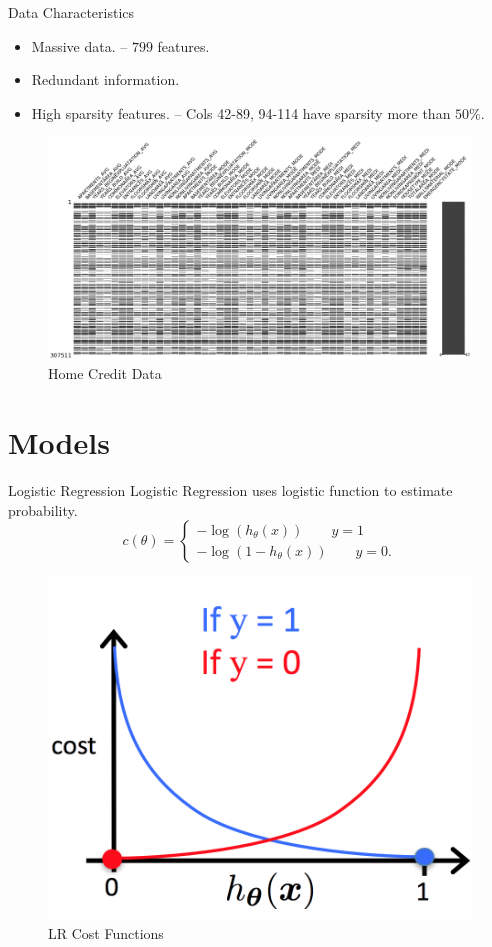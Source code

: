 \documentclass{beamer}
\begin{document}
\begin{frame}{Data Characteristics}
\begin{itemize}
\item Massive data. -- $799$ features. 
\item Redundant information. 
\item High sparsity features. -- Cols 42-89, 94-114 have sparsity more than $50\%$. 
\end{itemize}
\begin{figure}
  \includegraphics[width=\linewidth]{pic/sparse_data.png}
  \caption{Home Credit Data}
  \label{fig:data}
\end{figure}
\end{frame}
\section{Models}

\begin{frame}{Logistic Regression}
Logistic Regression uses logistic function to estimate probability. 
$$
c(\theta) = 
\begin{cases}
- \log(h_{\theta}(x)) \quad \quad y = 1 \\
- \log (1 - h_{\theta}(x)) \quad \quad y = 0. 
\end{cases}
$$

\begin{figure}
  \includegraphics[width=0.6\linewidth]{pic/cost_lr.png}
  \caption{LR Cost Functions}
  \label{fig:cost_lr}
\end{figure}

\end{frame}
\end{document}
